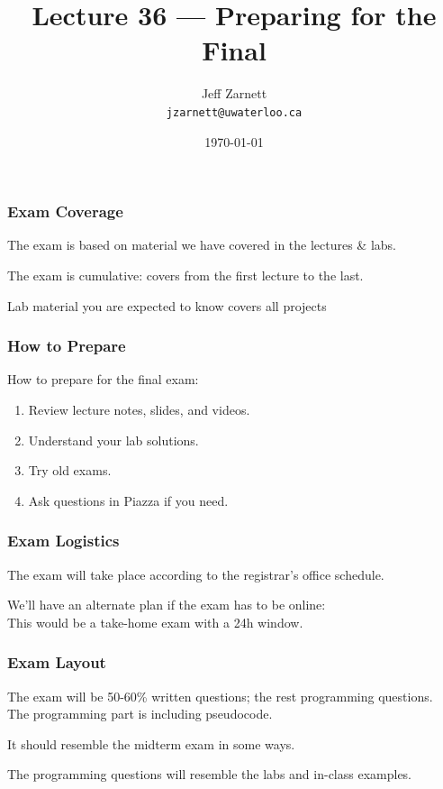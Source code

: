 

\title{Lecture 36 --- Preparing for the Final }

\author{Jeff Zarnett \\ \small \texttt{jzarnett@uwaterloo.ca}}
\date{\today}




\begin{frame}
  \titlepage

\end{frame}

\begin{frame}
\frametitle{Exam Coverage}

The exam is based on material we have covered in the lectures \& labs.

The exam is cumulative: covers from the first lecture to the last.

Lab material you are expected to know covers all projects

\end{frame}

\begin{frame}
\frametitle{How to Prepare}

How to prepare for the final exam:

\begin{enumerate}
	\item Review lecture notes, slides, and videos.
	\item Understand your lab solutions.
	\item Try old exams.
	\item Ask questions in Piazza if you need.
\end{enumerate}

\end{frame}


\begin{frame}
\frametitle{Exam Logistics}

The exam will take place according to the registrar's office schedule.

We'll have an alternate plan if the exam has to be online:\\
\quad This would be a take-home exam with a 24h window.

\end{frame}


\begin{frame}
\frametitle{Exam Layout}

The exam will be 50-60\% written questions; the rest programming questions.\\
\quad The programming part is including pseudocode.

It should resemble the midterm exam in some ways.

The programming questions will resemble the labs and in-class examples.

\end{frame}


